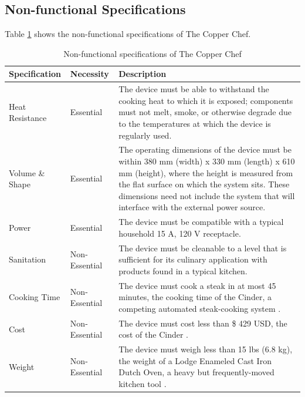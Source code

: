 \documentclass[11pt]{article}
\begin{document}
\newpage
\subsection{Non-functional Specifications}

Table \ref{table:non func spec} shows the non-functional specifications of The Copper Chef.

\begin{table}[H]
\begin{tabularx}{\textwidth}{l l X}
	\hline

	Specification & Necessity & Description \\

	\hline

	Heat Resistance & Essential & The device must be able to withstand the cooking heat to which it is exposed; components must not melt, smoke, or otherwise degrade due to the temperatures at which the device is regularly used.  \\

	Volume \& Shape & Essential & The operating dimensions of the device must be within 380 mm (width) x 330 mm (length) x 610 mm (height), where the height is measured from the flat surface on which the system sits.  These dimensions need not include the system that will interface with the external power source. \\

	Power & Essential & The device must be compatible with a typical household 15 A, 120 V receptacle. \\

	Sanitation & Non-Essential & The device must be cleanable to a level that is sufficient for its culinary application with products found in a typical kitchen. \\

	Cooking Time & Non-Essential & The device must cook a steak in at most 45 minutes, the cooking time of the Cinder, a competing automated steak-cooking system \cite{cinderprice}. \\

	Cost & Non-Essential & The device must cost less than \$ 429 USD, the cost of the Cinder \cite{cinderprice}. \\

	Weight & Non-Essential & The device must weigh less than 15 lbs (6.8 kg), the weight of a Lodge Enameled Cast Iron Dutch Oven, a heavy but frequently-moved kitchen tool \cite{lodgeweight}. \\

	\hline
\end{tabularx}
\caption{Non-functional specifications of The Copper Chef}
\label{table:non func spec}
\end{table}
\end{document}
